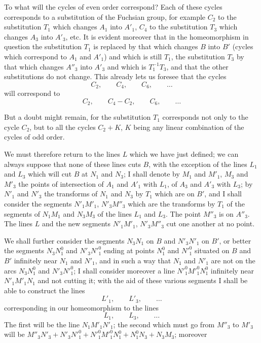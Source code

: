 \documentclass{article}
\begin{document}
To what will the cycles of even order correspond? Each of these cycles corresponds to a substitution of the Fuchsian group, for example $C_{2}$ to the substitution $T_{1}$ which changes $A_{1}$ into $A'_{1}$, $C_{4}$ to the substitution $T_{3}$ which changes $A_{3}$ into $A'_{3}$, etc. It is evident moreover that in the homeomorphism in question the substitution $T_{1}$ is replaced by that which changes $B$ into $B'$ (cycles which correspond to $A_{1}$ and $A'_{1}$) and which is still $T_{1}$, the substitution $T_{3}$ by that which changes $A''_{3}$ into $A'_{3}$ and which is $T^{-1}_{1} T_{3}$, and that the other substitutions do not change. This already lets us foresee that the cycles
\[ C_{2}, \qquad C_{4}, \qquad C_{6}, \qquad \ldots \]
will correspond to
\[ C_{2}, \qquad C_{4} - C_{2}, \qquad C_{6}, \qquad \ldots \]

But a doubt might remain, for the substitution $T_{1}$ corresponds not only to the cycle $C_{2}$, but to all the cycles $C_{2} + K$, $K$ being any linear combination of the cycles of odd order.

We must therefore return to the lines $L$ which we have just defined; we can always suppose that none of these lines cuts $B$, with the exception of the lines $L_{1}$ and $L_{3}$ which will cut $B$ at $N_{1}$ and $N_{3}$; I shall denote by $M_{1}$ and $M'_{1}$, $M_{3}$ and $M'_{3}$ the points of intersection of $A_{1}$ and $A'_{1}$ with $L_{1}$, of $A_{3}$ and $A'_{3}$ with $L_{3}$; by $N'_{1}$ and $N'_{3}$ the transforms of $N_{1}$ and $N_{3}$ by $T_{1}$ which are on $B'$, and I shall consider the segments $N'_{1}M'_{1}$, $N'_{3}M''_{3}$ which are the transforms by $T_{1}$ of the segments of $N_{1}M_{1}$ and $N_{3}M_{3}$ of the lines $L_{1}$ and $L_{3}$. The point $M''_{3}$ is on $A''_{3}$. The lines $L$ and the new segments $N'_{1}M'_{1}$, $N'_{3}M''_{3}$ cut one another at no point.

We shall further consider the segments $N_{3}N_{1}$ on $B$ and $N'_{3}N'_{1}$ on $B'$, or better the segments $N_{3}N^{0}_{1}$ and $N'_{3}N'^{0}_{1}$ ending at points $N^{0}_{1}$ and $N'^{0}_{1}$ situated on $B$ and $B'$ infinitely near $N_{1}$ and $N'_{1}$, and in such a way that $N_{1}$ and $N'_{1}$ are not on the arcs $N_{3}N^{0}_{1}$ and $N'_{3}N'^{0}_{1}$; I shall consider moreover a line $N'^{0}_{1}M'^{0}_{1}N^{0}_{1}$ infinitely near $N'_{1}M'_{1}N_{1}$ and not cutting it; with the aid of these various segments I shall be able to construct the lines
\[ L'_{1}, \qquad L'_{3}, \qquad \ldots \]
corresponding in our homeomorphism to the lines
\[ L_{1}, \qquad L_{3}, \qquad \ldots \]
The first will be the line $N_{1}M'_{1}N'_{1}$; the second which must go from $M''_{3}$ to $M'_{3}$ will be $M''_{3}N'_{3} + N'_{3}N'^{0}_{1} + N'^{0}_{1}M'^{0}_{1}N^{0}_{1} + N^{0}_{1}N_{3} + N_{3}M_{3}$; moreover
\end{document}
